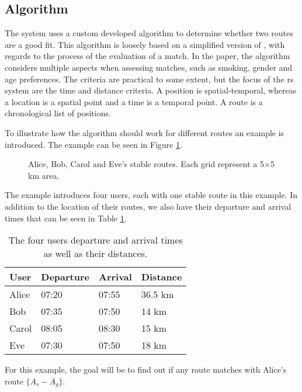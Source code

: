\subsection{Algorithm}
The system uses a custom developed algorithm to determine whether two routes are a good fit.
This algorithm is loosely based on a simplified version of \citet{ghoseiri2011real}, with regards to the process of the evaluation of a match.
In the paper, the algorithm considers multiple aspects when assessing matches, such as smoking, gender and age preferences.
The criteria are practical to some extent, but the focus of the \gls{rs} system are the time and distance criteria.
A position is spatial-temporal, whereas a location is a spatial point and a time is a temporal point.
A route is a chronological list of positions.

To illustrate how the algorithm should work for different routes an example is introduced. The example can be seen in Figure \ref{fig:algEx1}.
\begin{figure}[!ht]
    \centering

    \caption{Alice, Bob, Carol and Eve's stable routes. Each grid represent a 5$\times$5 km area.}
    \label{fig:algEx1}
\end{figure}
The example introduces four users, each with one stable route in this example. In addition to the location of their routes, we also have their departure and arrival times that can be seen in Table \ref{timetable}.
\begin{table}[]
\centering
\begin{tabular}{@{}llll@{}}
\toprule
\textbf{User} & \textbf{Departure} & \textbf{Arrival} & \textbf{Distance} 	\\ \midrule
Alice         & 07:20                   & 07:55       & 36.5 km 			\\
Bob           & 07:35                   & 07:50       & 14 km  		  		\\
Carol         & 08:05                   & 08:30       & 15 km         		\\
Eve           & 07:30                   & 07:50       & 18 km         		\\ \bottomrule
\end{tabular}
\caption{The four users departure and arrival times as well as their distances.}
\label{timetable}
\end{table}

For this example, the goal will be to find out if any route matches with Alice's route $\{A_s-A_g\}$.

